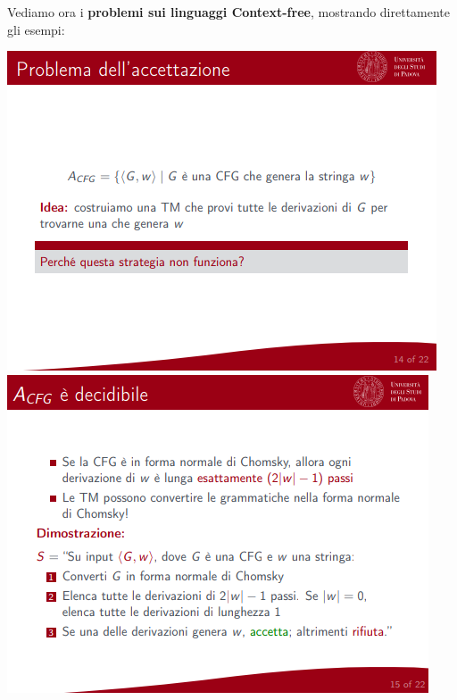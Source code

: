 \documentclass[]{article}
\begin{document}
\begin{center}
			\end{center}
			Vediamo ora i \textbf{problemi sui linguaggi Context-free}, mostrando direttamente gli esempi:
			\begin{center}
				\includegraphics[scale=0.8]{problemaCF1.png}
				\includegraphics[scale=0.8]{problemaCF2.png}

\end{center}
\end{document}
